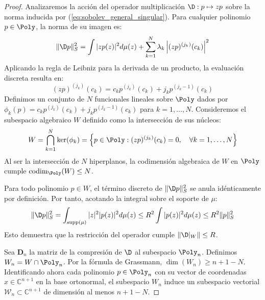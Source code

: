 \begin{proof}
	Analizaremos la acción del operador multiplicación $\D: p \mapsto zp$ sobre la norma inducida por (\ref{eq:sobolev_general_singular}). Para cualquier polinomio $p \in \Poly$, la norma de su imagen es:
	\begin{equation}
		\|\D p\|_S^2 = \int |zp(z)|^2 d\mu(z) + \sum_{k=1}^N \lambda_k \left| (zp)^{(j_k)}(c_k) \right|^2
	\end{equation}
	Aplicando la regla de Leibniz para la derivada de un producto, la evaluación discreta resulta en:
	\begin{equation}\label{eq:leibniz_eval}
		(zp)^{(j_k)}(c_k) = c_k p^{(j_k)}(c_k) + j_k p^{(j_k-1)}(c_k)
	\end{equation}
	Definimos un conjunto de $N$ funcionales lineales sobre $\Poly$ dados por $\phi_k(p) = c_k p^{(j_k)}(c_k) + j_k p^{(j_k-1)}(c_k)$ para $k=1,\dots,N$. Consideremos el subespacio algebraico $W$ definido como la intersección de sus núcleos:
	\begin{equation}
		W = \bigcap_{k=1}^N \ker(\phi_k) = \left\{ p \in \Poly : (zp)^{(j_k)}(c_k) = 0, \quad \forall k=1,\dots,N \right\}
	\end{equation}
	Al ser la intersección de $N$ hiperplanos, la codimensión algebraica de $W$ en $\Poly$ cumple $\operatorname{codim}_{\Poly}(W) \le N$.

	Para todo polinomio $p \in W$, el término discreto de $\|\D p\|_S^2$ se anula idénticamente por definición. Por tanto, acotando la integral sobre el soporte de $\mu$:
	\begin{equation}
		\|\D p\|_S^2 = \int_{\operatorname{supp}(\mu)} |z|^2 |p(z)|^2 d\mu(z) \le R^2 \int |p(z)|^2 d\mu(z) \le R^2 \|p\|_S^2
	\end{equation}
	Esto demuestra que la restricción del operador cumple $\|\D|_W\| \le R$.

	Sea $\mathbf{D}_n$ la matriz de la compresión de $\D$ al subespacio $\Poly_{n}$. Definimos $W_n = W \cap \Poly_{n}$. Por la fórmula de Grassmann, $\dim(W_n) \ge n+1 - N$. Identificando ahora cada polinomio $p \in \Poly_{n}$ con su vector de coordenadas $x \in \mathbb{C}^{n+1}$ en la base ortonormal, el subespacio $W_n$ induce un subespacio vectorial $\mathcal{W}_n \subset \mathbb{C}^{n+1}$ de dimensión al menos $n+1-N$.


\end{proof}
